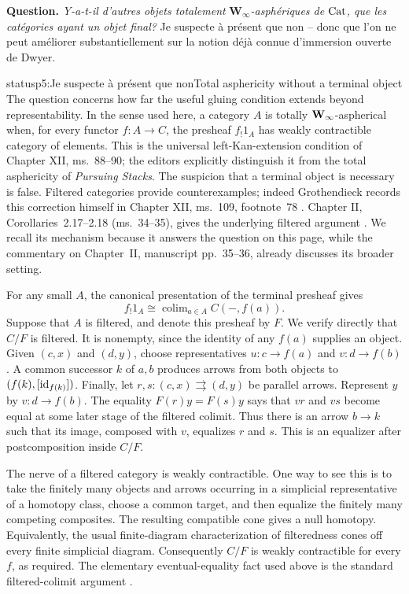 
\textbf{Question.} \textit{Y-a-t-il d'autres objets totalement} $\mathbf{W}_\infty$\textit{-asphériques de} $\mathrm{Cat}$\textit{, que les catégories ayant un objet final?} Je suspecte à présent que non -- donc que l'on ne peut améliorer substantiellement sur la notion déjà connue d'immersion ouverte de Dwyer.

\begin{dcomment}{status}{p5:Je suspecte à présent que non}{Total asphericity without a terminal object}
The question concerns how far the useful gluing condition extends beyond representability. In the sense used here, a category \(A\) is totally \(\mathbf{W}_{\infty}\)-aspherical when, for every functor \(f:A\to C\), the presheaf \(f_!1_A\) has weakly contractible category of elements. This is the universal left-Kan-extension condition of Chapter XII, ms.~88--90; the editors explicitly distinguish it from the total asphericity of \emph{Pursuing Stacks}. The suspicion that a terminal object is necessary is false. Filtered categories provide counterexamples; indeed Grothendieck records this correction himself in Chapter XII, ms.~109, footnote~78 \citep{Grothendieck1990XII}. Chapter II, Corollaries~2.17--2.18 (ms.~34--35), gives the underlying filtered argument \citep{Grothendieck1990II}. We recall its mechanism because it answers the question on this page, while the commentary on Chapter~II, manuscript pp.~35--36, already discusses its broader setting.

For any small \(A\), the canonical presentation of the terminal presheaf gives
\[
  f_!1_A\cong\mathop{\mathrm{colim}}_{a\in A}C(-,f(a)).
\]
Suppose that \(A\) is filtered, and denote this presheaf by \(F\). We verify directly that \(C/F\) is filtered. It is nonempty, since the identity of any \(f(a)\) supplies an object. Given \((c,x)\) and \((d,y)\), choose representatives \(u:c\to f(a)\) and \(v:d\to f(b)\). A common successor \(k\) of \(a,b\) produces arrows from both objects to \((f(k),[\mathrm{id}_{f(k)}])\). Finally, let \(r,s:(c,x)\rightrightarrows(d,y)\) be parallel arrows. Represent \(y\) by \(v:d\to f(b)\). The equality \(F(r)y=F(s)y\) says that \(vr\) and \(vs\) become equal at some later stage of the filtered colimit. Thus there is an arrow \(b\to k\) such that its image, composed with \(v\), equalizes \(r\) and \(s\). This is an equalizer after postcomposition inside \(C/F\).

The nerve of a filtered category is weakly contractible. One way to see this is to take the finitely many objects and arrows occurring in a simplicial representative of a homotopy class, choose a common target, and then equalize the finitely many competing composites. The resulting compatible cone gives a null homotopy. Equivalently, the usual finite-diagram characterization of filteredness cones off every finite simplicial diagram. Consequently \(C/F\) is weakly contractible for every \(f\), as required. The elementary eventual-equality fact used above is the standard filtered-colimit argument \citep[\S4.19]{StacksFiltered}.


\end{dcomment}

